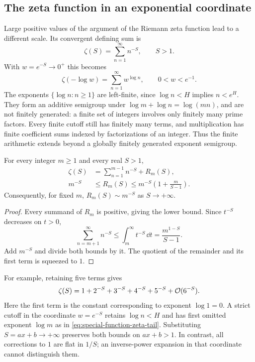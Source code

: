 \subsection{The zeta function in an exponential coordinate}

Large positive values of the argument of the Riemann zeta function
lead to a different scale. Its convergent defining sum is
\cite[(25.2.1)]{dlmf}
\[
 \zeta(S)=\sum_{n=1}^\infty n^{-S},\qquad S>1.
\]
With $w=e^{-S}\to0^+$ this becomes
\begin{equation}
 \zeta(-\log w)=\sum_{n=1}^\infty w^{\log n},
       \qquad 0<w<e^{-1}.
 \label{eq:special-function-zeta-coordinate}
\end{equation}
The exponents $\{\log n:n\ge1\}$ are left-finite, since
$\log n<H$ implies $n<e^H$. They form an additive semigroup under
$\log m+\log n=\log(mn)$, and are not finitely generated: a finite
set of integers involves only finitely many prime factors.
Every finite cutoff still has finitely many
terms, and multiplication has finite coefficient sums indexed by
factorizations of an integer. Thus the finite arithmetic extends
beyond a globally finitely generated exponent semigroup.

\begin{proposition}
\label{prop:special-function-zeta-tail}
For every integer $m\ge1$ and every real $S>1$,
\begin{equation}
\begin{aligned}
 \zeta(S)&=\sum_{n=1}^{m-1}n^{-S}+R_m(S),\\
 m^{-S}&\le R_m(S)
       \le m^{-S}\left(1+\frac{m}{S-1}\right).
\end{aligned}
\label{eq:special-function-zeta-tail}
\end{equation}
Consequently, for fixed $m$, $R_m(S)\sim m^{-S}$ as $S\to+\infty$.
\end{proposition}
\begin{proof}
Every summand of $R_m$ is positive, giving the lower bound. Since
$t^{-S}$ decreases on $t>0$,
\[
 \sum_{n=m+1}^\infty n^{-S}
       \le\int_m^\infty t^{-S}\,\dd t
       =\frac{m^{1-S}}{S-1}.
\]
Add $m^{-S}$ and divide both bounds by it. The quotient of the
remainder and its first term is squeezed to $1$.
\end{proof}

For example, retaining five terms gives
\begin{equation}
 \zeta(S)=1+2^{-S}+3^{-S}+4^{-S}+5^{-S}+\mathcal O(6^{-S}).
 \label{eq:special-function-zeta-five-terms}
\end{equation}
Here the first term is the constant corresponding to exponent
$\log1=0$. A strict cutoff in the coordinate $w=e^{-S}$ retains
$\log n<H$ and has first omitted exponent $\log m$ as in
\eqref{eq:special-function-zeta-tail}. Substituting
$S=ax+b\to+\infty$ preserves both bounds on $ax+b>1$.
In contrast, all corrections to $1$ are flat in $1/S$; an
inverse-power expansion in that coordinate cannot distinguish them.

